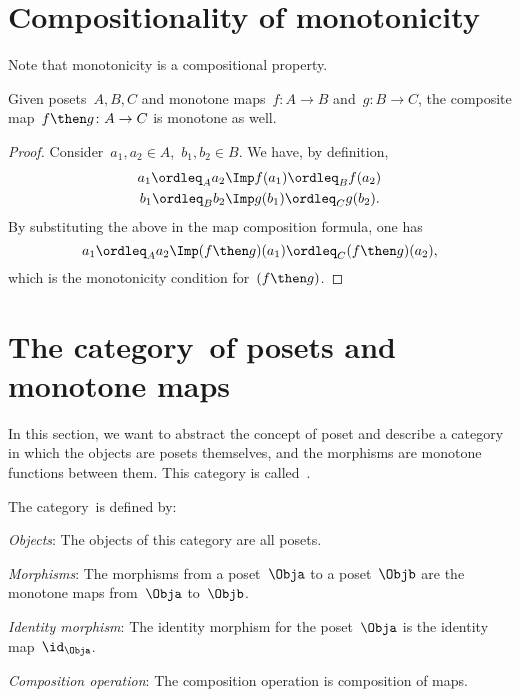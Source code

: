 \section{Compositionality of monotonicity}
Note that monotonicity is a compositional property.
\begin{lemma}
  Given posets~$A, B, C$ and monotone maps~$f\colon A \to B$ and~$g\colon B \to C$, the composite map~$f\then g\colon  A \to C$ is
  monotone as well.
\end{lemma}
\begin{proof}
  Consider~$a_1,a_2 \in A$,~$b_1,b_2\in B$. We have, by definition,
  \begin{equation}
    \begin{aligned}
      a_1\ordleq_A a_2 &\Imp f(a_1)\ordleq_B f(a_2)\\
      b_1\ordleq_B b_2 &\Imp g(b_1)\ordleq_C g(b_2).
    \end{aligned}
  \end{equation}
  By substituting the above in the map composition formula, one has
  \begin{equation}
    a_1\ordleq_A a_2 \Imp (f\then g)(a_1) \ordleq_C (f\then g)(a_2),
  \end{equation}
  which is the monotonicity condition for~$(f\then g)$.
\end{proof}

\section{The category~\Pos of posets and monotone maps}
In this section, we want to abstract the concept of poset and describe a category in which the objects are posets themselves, and the morphisms are monotone functions between them. This category is called~\Pos.

\begin{definition}
  The category~\Pos is defined by:
  \begin{compactenum}
    \item \emph{Objects}: The objects of this category are all posets.
    \item \emph{Morphisms}: The morphisms from a poset~$\Obja$ to a poset~$\Objb$ are the monotone maps from~$\Obja$ to~$\Objb$.
    \item \emph{Identity morphism}: The identity morphism for the poset~$\Obja$
    is the identity map~$\id_\Obja$.
    \item \emph{Composition operation}: The composition operation is composition of maps.
  \end{compactenum}
\end{definition}

